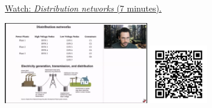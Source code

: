 
\begin{minipage}{10cm}
    \href{https://act4e-spring21.netlify.app/videos/spring2021-relations:relations:distr-networks.html}{Watch: \emph{Distribution networks} (7 minutes).}
        
    \href{https://act4e-spring21.netlify.app/videos/spring2021-relations:relations:distr-networks.html}{\includegraphics[height=3.5cm]{spring2021-relations:relations:distr-networks/thumbnails.jpg}}
    \href{https://act4e-spring21.netlify.app/videos/spring2021-relations:relations:distr-networks.html}{\includegraphics[height=2.5cm]{spring2021-relations:relations:distr-networks/qrcode.png}}
\end{minipage}
